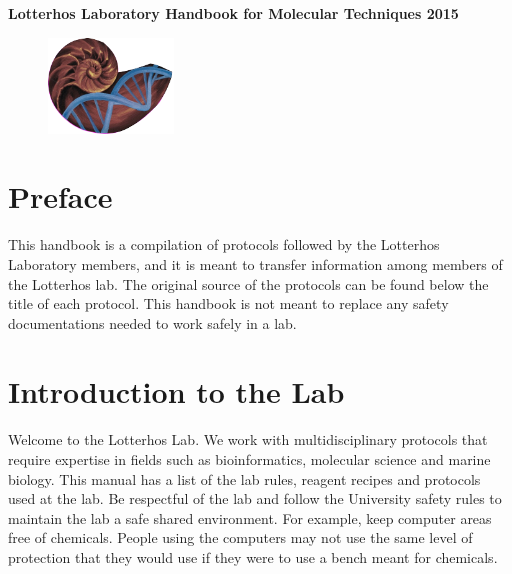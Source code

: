 \documentclass[11pt, oneside]{article}
\begin{document}

\hspace{5in}

\begin{center}

\LARGE{\bf Lotterhos Laboratory Handbook for Molecular Techniques
2015  }

\end{center}

\vspace{10mm}

\begin{figure}[h]
\begin{center}
\includegraphics[height=1in]{./images/Lab_Logo.pdf}
\end{center}
\end{figure}


\renewcommand\cftloftitlefont{\Large}

\newpage 

%
\tableofcontents
\listoffigures
\newpage


\section{Preface}


	This handbook is a compilation of protocols followed by the Lotterhos Laboratory members, and it is meant to transfer information among members of 	the Lotterhos lab. The original source of the protocols can be found below the title of each protocol. This handbook is not meant to replace any safety 	documentations needed to work safely in a lab. 

\newpage

\section{Introduction to the Lab}


	Welcome to the Lotterhos Lab. We work with multidisciplinary protocols that require expertise in fields such as bioinformatics, molecular science and 	marine biology. This manual has a list of the lab rules, reagent recipes and protocols used at the lab. Be respectful of the lab and follow the University 	safety rules to maintain the lab a safe shared environment. For example, keep computer areas free of chemicals. People using the computers may not 	use the same level of protection that they would use if they were to use a bench meant for chemicals. 
\end{document}
